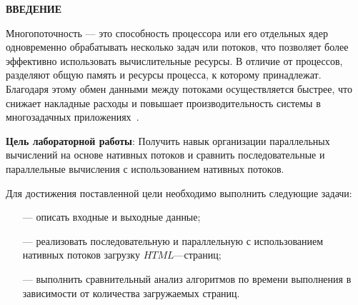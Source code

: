 \begin{center}
    \textbf{ВВЕДЕНИЕ}
\end{center}

Многопоточность — это способность процессора или его отдельных ядер одновременно обрабатывать несколько задач или потоков, что позволяет более эффективно использовать вычислительные ресурсы. В отличие от процессов, разделяют общую память и ресурсы процесса, к которому принадлежат. Благодаря этому обмен данными между потоками осуществляется быстрее, что снижает накладные расходы и повышает производительность системы в многозадачных приложениях~\cite{threads}.

\textbf{Цель лабораторной работы}: Получить навык организации параллельных вычислений на основе нативных потоков и сравнить последовательные и параллельные вычисления с использованием нативных потоков.

Для достижения поставленной цели необходимо выполнить следующие задачи:
\begin{itemize}
    \item[---] описать входные и выходные данные;
    \item[---] реализовать последовательную и параллельную с использованием нативных потоков загрузку  $HTML$---страниц;
    \item[---] выполнить сравнительный анализ алгоритмов по времени выполнения в зависимости от количества загружаемых страниц.
\end{itemize}